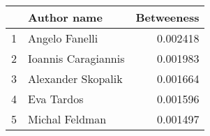 \begin{tabular}{llr}
\toprule
{} &          Author name &  Betweeness \\
\midrule
1 &       Angelo Fanelli &    0.002418 \\
2 &  Ioannis Caragiannis &    0.001983 \\
3 &   Alexander Skopalik &    0.001664 \\
4 &           Eva Tardos &    0.001596 \\
5 &       Michal Feldman &    0.001497 \\
\bottomrule
\end{tabular}
